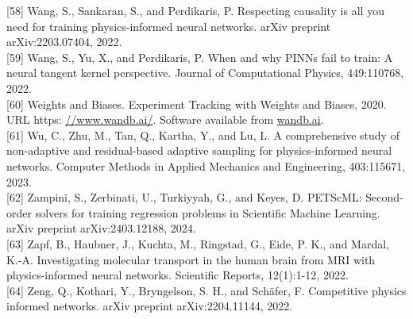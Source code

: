 \documentclass[10pt]{article}
\begin{document}
[58] Wang, S., Sankaran, S., and Perdikaris, P. Respecting causality is all you need for training physics-informed neural networks. arXiv preprint arXiv:2203.07404, 2022.\\[0pt]
[59] Wang, S., Yu, X., and Perdikaris, P. When and why PINNs fail to train: A neural tangent kernel perspective. Journal of Computational Physics, 449:110768, 2022.\\[0pt]
[60] Weights and Biases. Experiment Tracking with Weights and Biases, 2020. URL https: \href{//www.wandb.ai/}{//www.wandb.ai/}. Software available from \href{http://wandb.ai}{wandb.ai}.\\[0pt]
[61] Wu, C., Zhu, M., Tan, Q., Kartha, Y., and Lu, L. A comprehensive study of non-adaptive and residual-based adaptive sampling for physics-informed neural networks. Computer Methods in Applied Mechanics and Engineering, 403:115671, 2023.\\[0pt]
[62] Zampini, S., Zerbinati, U., Turkiyyah, G., and Keyes, D. PETScML: Second-order solvers for training regression problems in Scientific Machine Learning. arXiv preprint arXiv:2403.12188, 2024.\\[0pt]
[63] Zapf, B., Haubner, J., Kuchta, M., Ringstad, G., Eide, P. K., and Mardal, K.-A. Investigating molecular transport in the human brain from MRI with physics-informed neural networks. Scientific Reports, 12(1):1-12, 2022.\\[0pt]
[64] Zeng, Q., Kothari, Y., Bryngelson, S. H., and Schäfer, F. Competitive physics informed networks. arXiv preprint arXiv:2204.11144, 2022.
\end{document}
